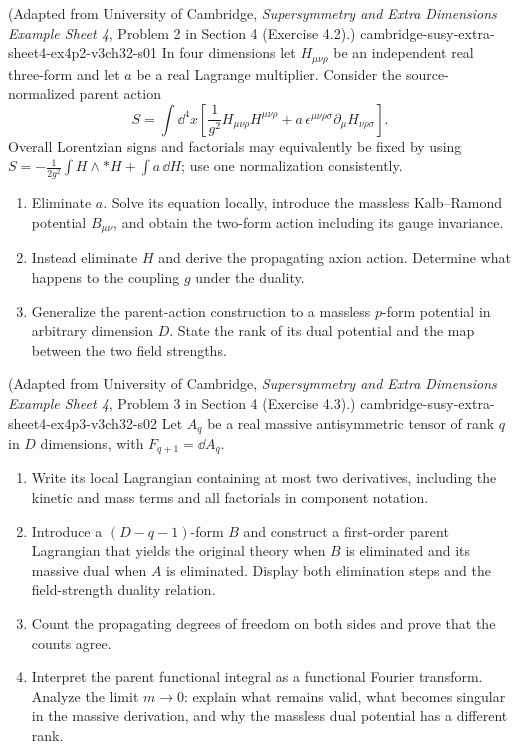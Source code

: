 
\begin{enumerate}
    {(Adapted from University of Cambridge, \emph{Supersymmetry and Extra
      Dimensions Example Sheet 4}, Problem 2 in Section 4 (Exercise 4.2).)}
    {cambridge-susy-extra-sheet4-ex4p2-v3ch32-s01}
  In four dimensions let \(H_{\mu\nu\rho}\) be an independent real
  three-form and let \(a\) be a real Lagrange multiplier.  Consider the
  source-normalized parent action
  \[
    S=\int \dd^4x\left[
      \frac1{g^2}H_{\mu\nu\rho}H^{\mu\nu\rho}
      +a\,\epsilon^{\mu\nu\rho\sigma}\partial_\mu H_{\nu\rho\sigma}
      \right].
  \]
  Overall Lorentzian signs and factorials may equivalently be fixed by using
  \(S=-\frac1{2g^2}\int H\wedge *H+\int a\,\dd H\); use one normalization
  consistently.
  \begin{enumerate}
    \item Eliminate \(a\).  Solve its equation locally, introduce the
      massless Kalb--Ramond potential \(B_{\mu\nu}\), and obtain the
      two-form action including its gauge invariance.
    \item Instead eliminate \(H\) and derive the propagating axion action.
      Determine what happens to the coupling \(g\) under the duality.
    \item Generalize the parent-action construction to a massless
      \(p\)-form potential in arbitrary dimension \(D\).  State the rank
      of its dual potential and the map between the two field strengths.
  \end{enumerate}

    {(Adapted from University of Cambridge, \emph{Supersymmetry and Extra
      Dimensions Example Sheet 4}, Problem 3 in Section 4 (Exercise 4.3).)}
    {cambridge-susy-extra-sheet4-ex4p3-v3ch32-s02}
  Let \(A_q\) be a real massive antisymmetric tensor of rank \(q\) in
  \(D\) dimensions, with \(F_{q+1}=\dd A_q\).
  \begin{enumerate}
    \item Write its local Lagrangian containing at most two derivatives,
      including the kinetic and mass terms and all factorials in component
      notation.
    \item Introduce a \((D-q-1)\)-form \(B\) and construct a first-order
      parent Lagrangian that yields the original theory when \(B\) is
      eliminated and its massive dual when \(A\) is eliminated.  Display
      both elimination steps and the field-strength duality relation.
    \item Count the propagating degrees of freedom on both sides and prove
      that the counts agree.
    \item Interpret the parent functional integral as a functional Fourier
      transform.  Analyze the limit \(m\to0\): explain what remains valid,
      what becomes singular in the massive derivation, and why the
      massless dual potential has a different rank.
  \end{enumerate}


\end{enumerate}
